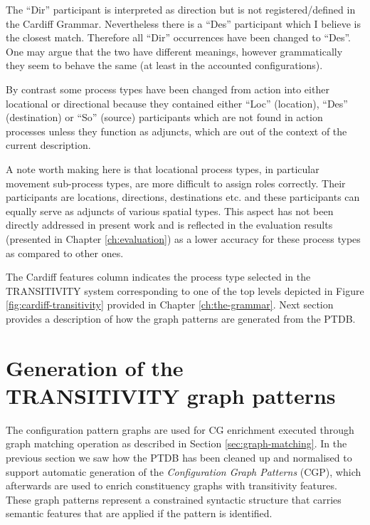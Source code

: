     The ``Dir'' participant is interpreted as direction but is not registered/defined in the Cardiff Grammar. Nevertheless there is a ``Des'' participant which I believe is the closest match. Therefore all ``Dir'' occurrences have been changed to ``Des''. One may argue that the two have different meanings, however grammatically they seem to behave the same (at least in the accounted configurations). 

    By contrast some process types have been changed from action into either locational or directional because they contained either ``Loc'' (location), ``Des'' (destination) or ``So'' (source) participants which are not found in action processes unless they function as adjuncts, which are out of the context of the current description.

    A note worth making here is that locational process types, in particular movement sub-process types, are more difficult to assign roles correctly. Their participants are locations, directions, destinations etc. and these participants can equally serve as adjuncts of various spatial types. This aspect has not been directly addressed in present work and is reflected in the evaluation results (presented in Chapter \ref{ch:evaluation}) as a lower accuracy for these process types as compared to other ones.

    The Cardiff features column indicates the process type selected in the TRANSITIVITY system corresponding to one of the top levels depicted in Figure \ref{fig:cardiff-transitivity} provided in Chapter \ref{ch:the-grammar}. Next section provides a description of how the graph patterns are generated from the PTDB. 

\section{Generation of the TRANSITIVITY graph patterns}
\label{sec:gen-sem}
    The configuration pattern graphs are used for CG enrichment executed through graph matching operation as described in Section \ref{sec:graph-matching}. In the previous section we saw how the PTDB has been cleaned up and normalised to support automatic generation of the \textit{Configuration Graph Patterns} (CGP), which afterwards are used to enrich constituency graphs with transitivity features. These graph patterns represent a constrained syntactic structure that carries semantic features that  are applied if the pattern is identified. 

